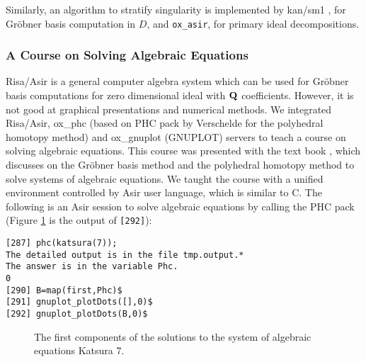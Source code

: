 Similarly, 
an algorithm to stratify singularity 
\cite{oaku-advance}
is implemented by
kan/sm1 \cite{kan}, for Gr\"obner basis computation in $D$, and
{\tt ox\_asir}, for primary ideal decompositions.

\subsubsection{A Course on Solving Algebraic Equations}

Risa/Asir \cite{asir} is a general computer algebra system
which can be used for Gr\"obner basis computations for zero dimensional ideal
with ${\bf Q}$ coefficients.
However, it is not good at graphical presentations and
numerical methods.
We integrated Risa/Asir, ox\_phc (based on PHC pack by Verschelde \cite{phc}
for the polyhedral homotopy method) and
ox\_gnuplot (GNUPLOT) servers
to teach a course on solving algebraic equations.
This course was presented with the text book \cite{CLO},
which discusses 
on the Gr\"obner basis method and the polyhedral homotopy method
to solve systems of algebraic equations.
We taught the course
with a unified environment
controlled by Asir user language, which is similar to C.
The following is an Asir session to solve algebraic equations by calling
the PHC pack (Figure \ref{katsura} is the output of {\tt [292]}):
\begin{verbatim}
[287] phc(katsura(7));
The detailed output is in the file tmp.output.*
The answer is in the variable Phc.
0
[290] B=map(first,Phc)$
[291] gnuplot_plotDots([],0)$
[292] gnuplot_plotDots(B,0)$
\end{verbatim}

\begin{figure}[htbp]
\epsfxsize=8.5cm
\caption{The first components of the solutions to the system of algebraic equations Katsura 7.}
\label{katsura}
\end{figure}




